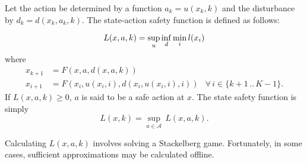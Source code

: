 \documentclass{article}
\newcommand{\aspace}{\ensuremath{\mathcal{A}} }
\begin{document}
Let the action be determined by a function $a_k = u(x_k, k)$ and the disturbance by $d_k = d(x_k, a_k, k)$.
The state-action safety function is defined as follows:

\begin{equation}
    L(x, a, k) = \underset{u}{\sup}\,\underset{d}{\inf}\,\underset{i}{\min}\,l(x_i) \\
\end{equation}
where
\begin{equation*}
    \begin{aligned}
        x_{k+1} &= F(x, a, d(x, a, k)) \\
        x_{i+1} &= F(x_i, u(x_i, i), d(x_i, u(x_i, i), i)) & \forall\, i \in \{k+1\,..\,K-1\} \text{.}
    \end{aligned}
\end{equation*}
If $L(x, a, k) \geq 0$, $a$ is said to be a safe action at $x$. The state safety function is simply
\begin{equation}
    L(x, k) = \underset{a\in\aspace}{\sup}\,L(x,a,k) \text{.}
\end{equation}

Calculating $L(x,a,k)$ involves solving a Stackelberg game. Fortunately, in some cases, sufficient approximations may be calculated offline.

% 
% 
\end{document}
